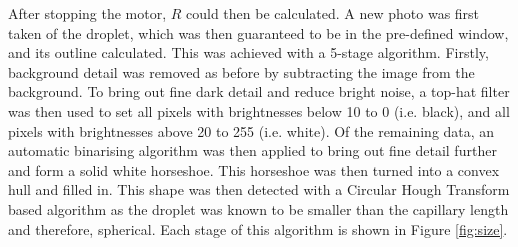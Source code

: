 \documentclass{physics_article_B}
\begin{document}
            After stopping the motor, $R$ could then be calculated. A new photo was first taken of the droplet, which was then guaranteed to be in the pre-defined window, and its outline calculated. This was achieved with a 5-stage algorithm. Firstly, background detail was removed as before by subtracting the image from the background. To bring out fine dark detail and reduce bright noise, a top-hat filter was then used to set all pixels with brightnesses below 10 to 0 (i.e. black), and all pixels with brightnesses above 20 to 255 (i.e. white). Of the remaining data, an automatic binarising algorithm was then applied to bring out fine detail further and form a solid white horseshoe. This horseshoe was then turned into a convex hull and filled in. This shape was then detected with a Circular Hough Transform based algorithm\cite{imfindcircles} as the droplet was known to be smaller than the capillary length and therefore, spherical. Each stage of this algorithm is shown in Figure \ref{fig:size}.
            \vspace{0.5cm}
\end{document}
